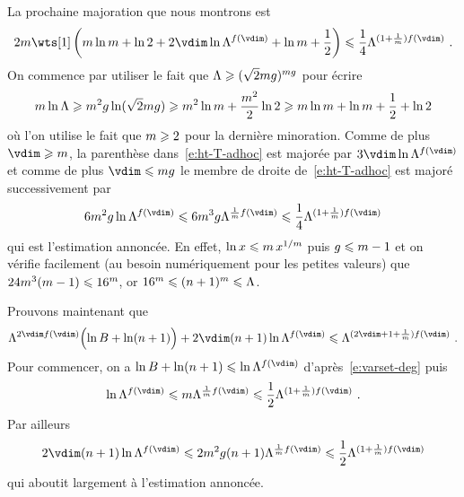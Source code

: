 La prochaine majoration  que nous montrons est
\begin{equation} \label{e:ht-T-adhoc}
  2\puiss \wts[1] \left(
    \puiss \ln \puiss + \ln 2 + 2\vdim \ln \Lambda^{f(\vdim)}
    + \ln \puiss + \frac12
  \right)
  \le
  \frac14 \Lambda^{ (1 + \frac1\puiss) f(\vdim) }
  \pmm.
\end{equation}
On commence par utiliser le fait que \( \Lambda \geqslant (\sqrt2
  mg)^{mg} \) pour écrire
\begin{equation}
  m \ln \Lambda
  \geqslant
  m^2 g \ln( \sqrt2 m g )
  \geqslant
  m^2 \ln m + \frac{ m^2 }2 \ln 2
  \geqslant
  m \ln m + \ln m + \frac12 + \ln 2
\end{equation}
où l'on utilise le fait que \( m \geqslant 2 \) pour la dernière minoration.
Comme de plus \( \vdim \ge \puiss \), la parenthèse dans~\eqref{e:ht-T-adhoc}
est majorée par \( 3\vdim \ln \Lambda^{f(\vdim)} \) et comme de plus \( \vdim
  \le \puiss\genre \) le membre de droite de~\eqref{e:ht-T-adhoc} est majoré
successivement par
\begin{equation}
  6 \puiss^2 \genre \ln \Lambda^{f(\vdim)}
  \le
  6 \puiss^3 \genre \Lambda^{\frac1\puiss f(\vdim)}
  \le
  \frac14 \Lambda^{(1 + \frac1\puiss) f(\vdim)}
\end{equation}
qui est l'estimation annoncée. En effet, \( \ln x \leqslant m \, x^{1/m}
\) puis \( g \leqslant m - 1 \) et on vérifie facilement (au besoin
numériquement pour les petites valeurs) que \( 24 m^3 (m - 1) \leqslant
  16^{m} \), or \( 16^m \leqslant (n + 1)^m \leqslant \Lambda \).

Prouvons maintenant que
\begin{equation} \label{e:ht-T'-adhoc}
  \Lambda^{2\vdim f(\vdim)} \Bigl( \ln B + \ln(\dimp + 1) \Bigr)
  + 2\vdim (\dimp + 1) \ln \Lambda^{f(\vdim)}
  \le
  \Lambda^{(2\vdim + 1 + \frac1\puiss) f(\vdim)}
  \pmm.
\end{equation}
Pour commencer, on a \( \ln B + \ln(\dimp + 1) \le \ln \Lambda^{f(\vdim)} \)
d'après~\eqref{e:varset-deg} puis
\begin{equation}
  \ln \Lambda^{f(\vdim)}
  \le
  \puiss \Lambda^{\frac1\puiss f(\vdim)}
  \le
  \frac12 \Lambda^{(1 + \frac1\puiss) f(\vdim)}
  \pmm.
\end{equation}
Par ailleurs
\begin{equation}
  2 \vdim (\dimp + 1) \ln \Lambda^{f(\vdim)}
  \le
  2 \puiss^2 \genre (\dimp + 1) \Lambda^{\frac1\puiss f(\vdim)}
  \le
  \frac12 \Lambda^{(1 + \frac1\puiss) f(\vdim)}
\end{equation}
qui aboutit largement à l'estimation annoncée.

